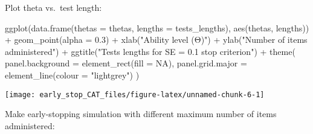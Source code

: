 \documentclass[
]{article}
\newenvironment{Shaded}{\begin{snugshade}}{\end{snugshade}}
\newcommand{\AttributeTok}[1]{\textcolor[rgb]{0.77,0.63,0.00}{#1}}
\newcommand{\ConstantTok}[1]{\textcolor[rgb]{0.00,0.00,0.00}{#1}}
\newcommand{\FloatTok}[1]{\textcolor[rgb]{0.00,0.00,0.81}{#1}}
\newcommand{\FunctionTok}[1]{\textcolor[rgb]{0.00,0.00,0.00}{#1}}
\newcommand{\NormalTok}[1]{#1}
\newcommand{\SpecialCharTok}[1]{\textcolor[rgb]{0.00,0.00,0.00}{#1}}
\newcommand{\StringTok}[1]{\textcolor[rgb]{0.31,0.60,0.02}{#1}}
\begin{document}
Plot theta vs.~test length:

\begin{Shaded}
\begin{Highlighting}[]
\FunctionTok{ggplot}\NormalTok{(}\FunctionTok{data.frame}\NormalTok{(}\AttributeTok{thetas =}\NormalTok{ thetas, }\AttributeTok{lengths =}\NormalTok{ tests\_lengths), }\FunctionTok{aes}\NormalTok{(thetas, lengths)) }\SpecialCharTok{+}
  \FunctionTok{geom\_point}\NormalTok{(}\AttributeTok{alpha =} \FloatTok{0.3}\NormalTok{) }\SpecialCharTok{+}
  \FunctionTok{xlab}\NormalTok{(}\StringTok{"Ability level (Θ)"}\NormalTok{) }\SpecialCharTok{+}
  \FunctionTok{ylab}\NormalTok{(}\StringTok{"Number of items administered"}\NormalTok{) }\SpecialCharTok{+}
  \FunctionTok{ggtitle}\NormalTok{(}\StringTok{"Tests lengths for SE = 0.1 stop criterion"}\NormalTok{) }\SpecialCharTok{+}
  \FunctionTok{theme}\NormalTok{(}
  \AttributeTok{panel.background =} \FunctionTok{element\_rect}\NormalTok{(}\AttributeTok{fill =} \ConstantTok{NA}\NormalTok{),}
  \AttributeTok{panel.grid.major =} \FunctionTok{element\_line}\NormalTok{(}\AttributeTok{colour =} \StringTok{"lightgrey"}\NormalTok{)}
\NormalTok{)}
\end{Highlighting}
\end{Shaded}

\begin{center}\texttt{[image: early\_stop\_CAT\_files/figure-latex/unnamed-chunk-6-1]} \end{center}

Make early-stopping simulation with different maximum number of items
administered:
\end{document}

